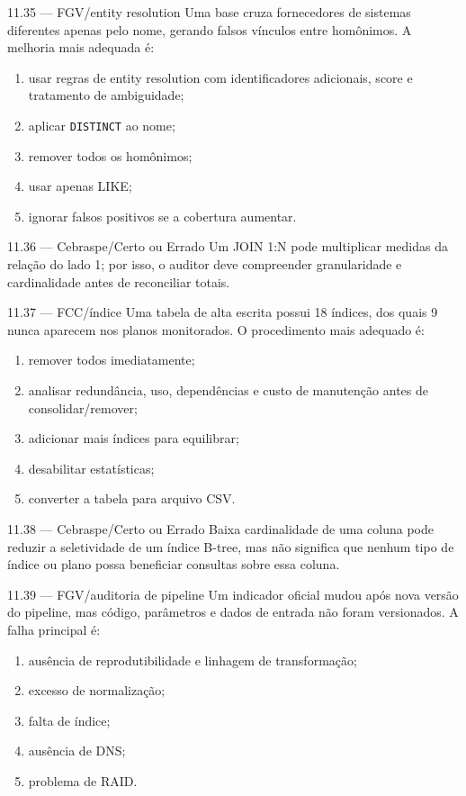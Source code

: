 \begin{questao}{ 11.35 — FGV/entity resolution}
Uma base cruza fornecedores de sistemas diferentes apenas pelo nome, gerando falsos vínculos entre homônimos. A melhoria mais adequada é:
\begin{enumerate}[label=\Alph*)]
\item usar regras de entity resolution com identificadores adicionais, score e tratamento de ambiguidade;
\item aplicar \texttt{DISTINCT} ao nome;
\item remover todos os homônimos;
\item usar apenas LIKE;
\item ignorar falsos positivos se a cobertura aumentar.
\end{enumerate}
\end{questao}

\begin{questao}{ 11.36 — Cebraspe/Certo ou Errado}
Um JOIN 1:N pode multiplicar medidas da relação do lado 1; por isso, o auditor deve compreender granularidade e cardinalidade antes de reconciliar totais.
\end{questao}

\begin{questao}{ 11.37 — FCC/índice}
Uma tabela de alta escrita possui 18 índices, dos quais 9 nunca aparecem nos planos monitorados. O procedimento mais adequado é:
\begin{enumerate}[label=\Alph*)]
\item remover todos imediatamente;
\item analisar redundância, uso, dependências e custo de manutenção antes de consolidar/remover;
\item adicionar mais índices para equilibrar;
\item desabilitar estatísticas;
\item converter a tabela para arquivo CSV.
\end{enumerate}
\end{questao}

\begin{questao}{ 11.38 — Cebraspe/Certo ou Errado}
Baixa cardinalidade de uma coluna pode reduzir a seletividade de um índice B-tree, mas não significa que nenhum tipo de índice ou plano possa beneficiar consultas sobre essa coluna.
\end{questao}

\begin{questao}{ 11.39 — FGV/auditoria de pipeline}
Um indicador oficial mudou após nova versão do pipeline, mas código, parâmetros e dados de entrada não foram versionados. A falha principal é:
\begin{enumerate}[label=\Alph*)]
\item ausência de reprodutibilidade e linhagem de transformação;
\item excesso de normalização;
\item falta de índice;
\item ausência de DNS;
\item problema de RAID.
\end{enumerate}
\end{questao}

